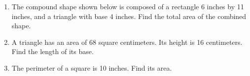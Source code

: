 \begin{enumerate}
\item The compound shape shown below is composed of a rectangle 6 inches by 11 inches, and a triangle with base 4 inches. Find the total area of the combined shape.
    \vspace{0.5cm} 
    \begin{flushleft}
    \end{flushleft}

\item A triangle has an area of 68 square centimeters. Its height is 16 centimeters. Find the length of its base. \vspace{3cm}

\item The perimeter of a square is 10 inches. Find its area. \vspace{4cm}

\end{enumerate}
